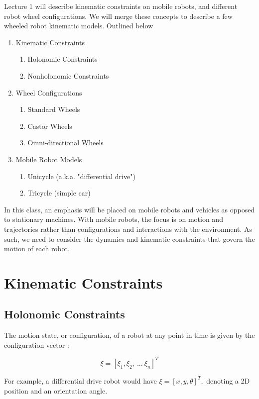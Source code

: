 \documentclass[twoside]{article}
\begin{document}
Lecture 1 will describe kinematic constraints on mobile robots, and different robot wheel configurations. We will merge these concepts to describe a few wheeled robot kinematic models. Outlined below
\begin{enumerate}
    \item Kinematic Constraints
    \begin{enumerate}
        \item Holonomic Constraints
        \item Nonholonomic Constraints
    \end{enumerate}
    \item Wheel Configurations
    \begin{enumerate}
        \item Standard Wheels
        \item Castor Wheels
        \item Omni-directional Wheels
    \end{enumerate}
    \item Mobile Robot Models
    \begin{enumerate}
        \item Unicycle (a.k.a. "differential drive")
        \item Tricycle (simple car)
    \end{enumerate}
\end{enumerate}

In this class, an emphasis will be placed on mobile robots and vehicles as opposed to stationary machines. With mobile robots, the focus is on motion and trajectories rather than configurations and interactions with the environment. As such, we need to consider the dynamics and kinematic constraints that govern the motion of each robot.

\section*{Kinematic Constraints}
\subsection*{Holonomic Constraints}

The motion state, or configuration, of a robot at any point in time is given by the configuration vector \cite{ssvo}:

$$
\xi = [\xi_1, \xi_2, \ ... \  \xi_n]^T
$$

For example, a differential drive robot would have $ \xi = [x, y, \theta]^T, $ denoting a 2D position and an orientation angle.
\end{document}
